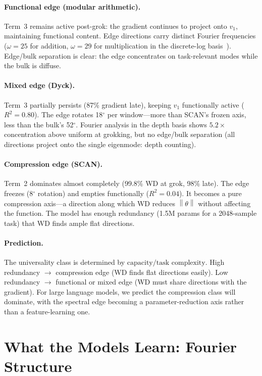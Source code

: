 \documentclass[11pt]{article}
\newcommand{\norm}[1]{\left\|#1\right\|}
\begin{document}
\paragraph{Functional edge (modular arithmetic).}
Term~3 remains active post-grok: the gradient continues to project onto $v_1$, maintaining functional content.
Edge directions carry distinct Fourier frequencies ($\omega = 25$ for addition, $\omega = 29$ for multiplication in the discrete-log basis~\citep{xu2026functional_modes}).
Edge/bulk separation is clear: the edge concentrates on task-relevant modes while the bulk is diffuse.

\paragraph{Mixed edge (Dyck).}
Term~3 partially persists (87\% gradient late), keeping $v_1$ functionally active ($R^2 = 0.80$).
The edge rotates 18$^\circ$ per window---more than SCAN's frozen axis, less than the bulk's 52$^\circ$.
Fourier analysis in the depth basis shows $5.2\times$ concentration above uniform at grokking, but no edge/bulk separation (all directions project onto the single eigenmode: depth counting).

\paragraph{Compression edge (SCAN).}
Term~2 dominates almost completely (99.8\% WD at grok, 98\% late).
The edge freezes (8$^\circ$ rotation) and empties functionally ($R^2 = 0.04$).
It becomes a pure compression axis---a direction along which WD reduces $\norm{\theta}$ without affecting the function.
The model has enough redundancy (1.5M params for a 2048-sample task) that WD finds ample flat directions.

\paragraph{Prediction.}
The universality class is determined by $\text{capacity} / \text{task complexity}$.
High redundancy $\to$ compression edge (WD finds flat directions easily).
Low redundancy $\to$ functional or mixed edge (WD must share directions with the gradient).
For large language models, we predict the compression class will dominate, with the spectral edge becoming a parameter-reduction axis rather than a feature-learning one.


\section{What the Models Learn: Fourier Structure}
\label{sec:fourier}
\end{document}
